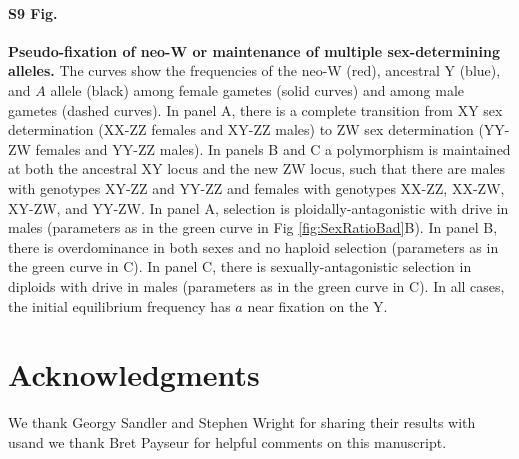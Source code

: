 \documentclass[10pt,letterpaper]{article}
\providecommand{\DIFadd}[1]{{\protect\color{blue}\uwave{#1}}} %
\providecommand{\DIFaddbegin}{} %
\providecommand{\DIFaddend}{} %
\providecommand{\DIFdelbegin}{} %
\providecommand{\DIFdelend}{} %
\begin{document}
\paragraph*{S9 Fig.}
\label{fig:freqAll}
{\bf Pseudo-fixation of neo-W or maintenance of multiple sex-determining alleles. }
The curves show the frequencies of the neo-W (red), ancestral Y (blue), and $A$ allele (black) among female gametes (solid curves) and among male gametes (dashed curves). 
In panel A, there is a complete transition from XY sex determination (XX-ZZ females and XY-ZZ males) to ZW sex determination (YY-ZW females and YY-ZZ males).  
In panels B and C a polymorphism is maintained at both the ancestral XY locus and the new ZW locus, such that there are males with genotypes XY-ZZ and YY-ZZ and females with genotypes XX-ZZ, XX-ZW, XY-ZW, and YY-ZW. 
In panel A, selection is ploidally-antagonistic with drive in males (parameters as in the green curve in Fig \ref{fig:SexRatioBad}B).
In panel B, there is overdominance in both sexes and no haploid selection (parameters as in the green curve in C).
In panel C, there is sexually-antagonistic selection in diploids with drive in males (parameters as in the green curve in C).
In all cases, the initial equilibrium frequency has $a$ near fixation on the Y.

\section*{Acknowledgments}
We thank Georgy Sandler and Stephen Wright for sharing their results with us\DIFaddbegin \DIFadd{, }\DIFaddend and we thank Bret Payseur \DIFaddbegin \DIFadd{and three anonymous reviewers }\DIFaddend for helpful comments on this manuscript. 

\nolinenumbers

%
%
% 
\DIFdelbegin %
\DIFdelend \DIFaddbegin 
\DIFaddend 
\end{document}
